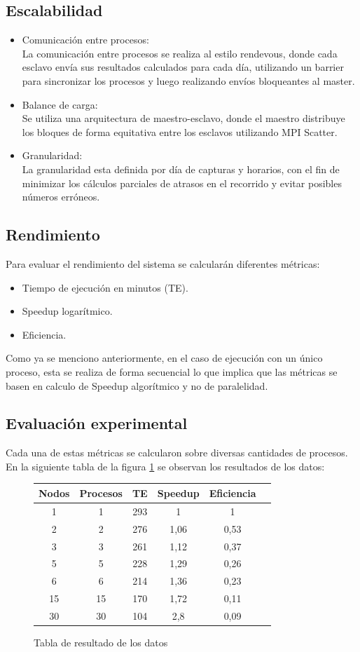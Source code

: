 \documentclass[journal]{IEEEtran}
\begin{document}
\subsection{Escalabilidad}
\begin{itemize}
\item Comunicación entre procesos:\\
La comunicación entre procesos se realiza al estilo rendevous, donde cada esclavo envía sus resultados calculados para cada día, utilizando un barrier para sincronizar los procesos y luego realizando envíos bloqueantes al master. 
\item Balance de carga:\\
Se utiliza una arquitectura de maestro-esclavo, donde el maestro distribuye los bloques de forma equitativa entre los esclavos utilizando MPI Scatter. 
\item Granularidad:\\
La granularidad esta definida por día de capturas 
y horarios, con el fin de minimizar los cálculos parciales de atrasos en el recorrido y evitar posibles números erróneos.
\end{itemize}
\subsection{Rendimiento}
Para evaluar el rendimiento del sistema se calcularán diferentes métricas:
\begin{itemize}
\item Tiempo de ejecución en minutos (TE).
\item Speedup logarítmico.
\item Eficiencia.
\end{itemize}
Como ya se menciono anteriormente, en el caso de ejecución con un único proceso, esta se realiza de forma secuencial lo que implica que las métricas se basen en calculo de Speedup algorítmico y no de paralelidad.

\subsection{Evaluación experimental}
Cada una de estas métricas se calcularon sobre diversas cantidades de procesos. En la siguiente tabla de la figura \ref{fig:table} se observan los resultados de los datos:

\begin{figure}[h]
\begin{tabular}{ |c|c|c|c|c|c| } 
\hline
Nodos & Procesos & TE & Speedup & Eficiencia \\
\hline
1 & 1 & 293 & 1 & 1  \\
\hline
2 & 2 & 276 & 1,06 & 0,53  \\
\hline
3 & 3 & 261 & 1,12 & 0,37  \\
\hline
5 & 5 & 228 & 1,29 & 0,26  \\
\hline
6 & 6 & 214 & 1,36 & 0,23  \\
\hline
15 & 15 & 170 & 1,72 & 0,11  \\
\hline
30 & 30 & 104 & 2,8 & 0,09  \\
\hline
\end{tabular}
\caption{Tabla de resultado de los datos}
\label{fig:table}
\end{figure}
\end{document}
